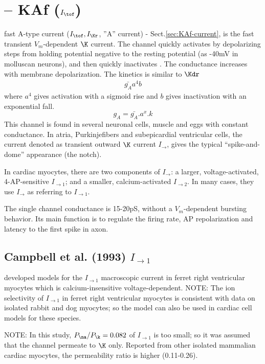 \section{-- KAf ($I_\tof$)}

fast A-type current ($I_\tof, I_\Kr$, ''A'' current) -
Sect.\ref{sec:KAf-current}, is the fast transient $V_m$-dependent $\K$ current.
The channel quickly activates by depolarizing steps from holding potential
negative to the resting potential (as -40mV in molluscan neurons), and then
quickly inactivates \citep{connor1971prf}. The conductance increases with
membrane depolarization. The kinetics is similar to $\Kdr$
\begin{eqnarray}
  \label{eq:2351}
  \bar{g_A}a^4b
\end{eqnarray}
where $a^4$ gives activation with a sigmoid rise and $b$ gives
inactivation with an exponential fall.\begin{equation}
g_A = \bar{g_A}.a^x.k
\end{equation}
This channel is found in several neuronal cells, muscle and eggs with constant
conductance. In atria, Purkinjefibers and subepicardial ventricular cells, the
current denoted as transient outward $\K$ current $I_\to$, gives the
typical ``spike-and-dome'' appearance (the notch). 

In cardiac myocytes, there are two components of $I_\to$: a larger, voltage-activated,
4-AP-sensitive $I_{\to1}$; and a smaller, calcium-activated $I_{\to2}$. In many
cases, they use $I_\to$ as referring to $I_{\to1}$.

The single channel conductance is 15-20pS, without a $V_m$-dependent bursting
behavior. Its main function is to regulate the firing rate, AP repolarization
and latency to the first spike in axon.


\subsection{Campbell et al. (1993) $I_{\to1}$}
\label{sec:campbell93_Ito1}

\citep{Campbell1993} developed models for the $I_{\to1}$ macroscopic current in
ferret right ventricular myocytes which is calcium-insensitive
voltage-dependent. NOTE: The ion selectivity of $I_{\to1}$ in ferret right
ventricular myocytes is consistent with data on isolated rabbit and dog
myocytes; so the model can also be used in cardiac cell models for these
species.

NOTE: In this study, $P_\na/P_\k=0.082$ of $I_{\to1}$ is too small; so it was
assumed that the channel permeate to $\K$ only. Reported from other isolated mammalian cardiac
myocytes, the permeability ratio is higher (0.11-0.26).

